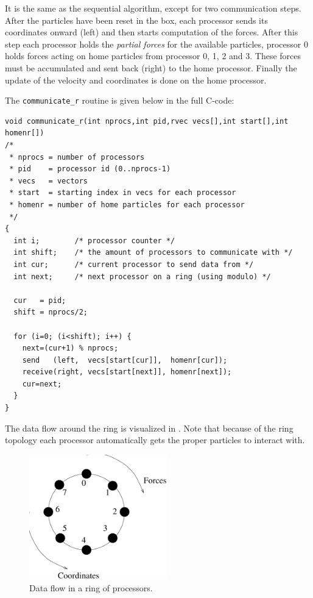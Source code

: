 {It is the same as the sequential algorithm, except for two
communication steps. After the particles have been reset in the box,
each processor sends its coordinates onward (left) and then starts computation
of the forces.  After this step each processor holds the {\em partial
forces} for the available particles, {\eg} processor 0 holds forces
acting on home particles from processor 0, 1, 2 and 3. These forces
must be accumulated and sent back (right) to the home
processor. Finally the update of the velocity and coordinates is done
on the home processor.

The {\tt communicate\_r} routine is given below in the full C-code:
\begin{footnotesize}
\begin{verbatim}
void communicate_r(int nprocs,int pid,rvec vecs[],int start[],int homenr[])
/* 
 * nprocs = number of processors
 * pid    = processor id (0..nprocs-1)
 * vecs   = vectors
 * start  = starting index in vecs for each processor
 * homenr = number of home particles for each processor
 */
{
  int i;        /* processor counter */
  int shift;    /* the amount of processors to communicate with */
  int cur;      /* current processor to send data from */
  int next;     /* next processor on a ring (using modulo) */

  cur   = pid;
  shift = nprocs/2;

  for (i=0; (i<shift); i++) {
    next=(cur+1) % nprocs;      
    send   (left,  vecs[start[cur]],  homenr[cur]);
    receive(right, vecs[start[next]], homenr[next]);
    cur=next;
  }
}
\end{verbatim}

\end{footnotesize}

The data flow around the ring is visualized in . 
Note that because of the ring topology each processor automatically 
gets the proper particles to interact with.
\begin {figure}
\centerline{\includegraphics[width=6cm]{plots/ring}}
\caption {Data flow in a ring of processors.}
\label{fig:ring}
\end {figure}

}
